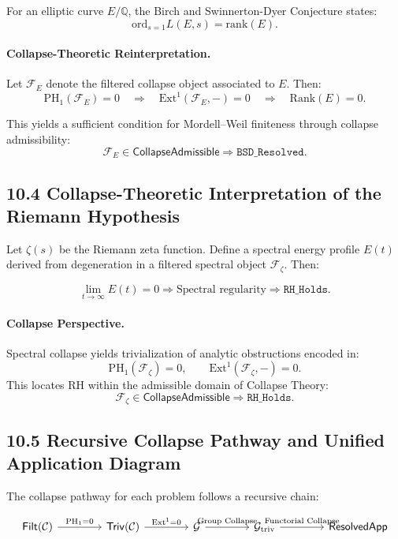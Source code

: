 \documentclass[11pt]{article}
\begin{document}
For an elliptic curve \( E/\mathbb{Q} \), the Birch and Swinnerton-Dyer Conjecture states:
\[
\mathrm{ord}_{s=1} L(E, s) = \mathrm{rank}(E).
\]

\paragraph{Collapse-Theoretic Reinterpretation.}
Let \( \mathcal{F}_E \) denote the filtered collapse object associated to \( E \). Then:
\[
\mathrm{PH}_1(\mathcal{F}_E) = 0 \quad \Rightarrow \quad \mathrm{Ext}^1(\mathcal{F}_E, -) = 0 \quad \Rightarrow \quad \mathrm{Rank}(E) = 0.
\]

This yields a sufficient condition for Mordell–Weil finiteness through collapse admissibility:
\[
\mathcal{F}_E \in \mathsf{CollapseAdmissible} \Rightarrow \texttt{BSD\_Resolved}.
\]

\subsection*{10.4 Collapse-Theoretic Interpretation of the Riemann Hypothesis}

Let \( \zeta(s) \) be the Riemann zeta function. Define a spectral energy profile \( E(t) \) derived from degeneration in a filtered spectral object \( \mathcal{F}_\zeta \). Then:

\[
\lim_{t \to \infty} E(t) = 0 \Rightarrow \text{Spectral regularity} \Rightarrow \texttt{RH\_Holds}.
\]

\paragraph{Collapse Perspective.}
Spectral collapse yields trivialization of analytic obstructions encoded in:
\[
\mathrm{PH}_1(\mathcal{F}_\zeta) = 0, \qquad \mathrm{Ext}^1(\mathcal{F}_\zeta, -) = 0.
\]
This locates RH within the admissible domain of Collapse Theory:
\[
\mathcal{F}_\zeta \in \mathsf{CollapseAdmissible} \Rightarrow \texttt{RH\_Holds}.
\]

\subsection*{10.5 Recursive Collapse Pathway and Unified Application Diagram}

The collapse pathway for each problem follows a recursive chain:

\[
\begin{tikzcd}[column sep=4em]
\mathsf{Filt}(\mathcal{C}) \arrow[r, "\mathrm{PH}_1 = 0"]
& \mathsf{Triv}(\mathcal{C}) \arrow[r, "\mathrm{Ext}^1 = 0"]
& \mathcal{G} \arrow[r, "\text{Group Collapse}"]
& \mathcal{G}_{\mathrm{triv}} \arrow[r, "\text{Functorial Collapse}"]
& \mathsf{ResolvedApp}
\end{tikzcd}
\]
\end{document}
